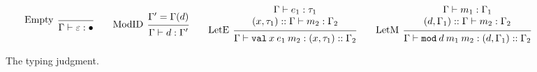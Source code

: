 \documentclass{article}
\theoremstyle{definition}
\newcommand*{\cons}{::}
\newcommand*{\modid}{d}
\newcommand*{\Lete}{\mathtt{val}}
\newcommand*{\Letm}{\mathtt{mod}}
\begin{document}
\begin{figure}[h!]
  \[
    \begin{prooftree}
      \infer[left label=Empty]0{
      \Gamma\vdash\varepsilon:\bullet
      }
    \end{prooftree}\qquad
    \begin{prooftree}
      \hypo{\Gamma'=\Gamma(\modid)}
      \infer[left label=ModID]1{
      \Gamma\vdash\modid:\Gamma'
      }
    \end{prooftree}\qquad
    \begin{prooftree}
      \hypo{
        \begin{matrix}
          \Gamma\vdash e_1:\tau_1 \\
          (x, \tau_1)\cons\Gamma\vdash m_2:\Gamma_2
        \end{matrix}
      }
      \infer[left label=LetE]1{
      \Gamma\vdash\Lete\:x\:e_1\:m_2:(x,\tau_1)\cons\Gamma_2
      }
    \end{prooftree}\qquad
    \begin{prooftree}
      \hypo{
        \begin{matrix}
          \Gamma\vdash m_1:\Gamma_1 \\
          (\modid, \Gamma_1)\cons\Gamma\vdash m_2:\Gamma_2
        \end{matrix}
      }
      \infer[left label=LetM]1{
      \Gamma\vdash\Letm\:\modid\:m_{1}\:m_{2}:(\modid,\Gamma_1)\cons\Gamma_2
      }
    \end{prooftree}
  \]
  \caption{The typing judgment.}
  \label{fig:typjudge}
\end{figure}
\end{document}
